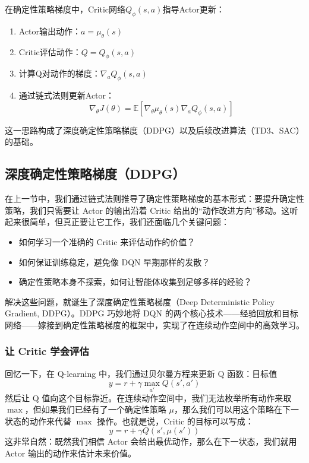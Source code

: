 \documentclass[lang=cn,zihao=-4,a4paper,fontset=windows]{beautybook}
\begin{document}
在确定性策略梯度中，Critic网络$Q_\phi(s,a)$指导Actor更新：
\begin{enumerate}
    \item Actor输出动作：$a = \mu_\theta(s)$
    \item Critic评估动作：$Q = Q_\phi(s, a)$
    \item 计算Q对动作的梯度：$\nabla_a Q_\phi(s, a)$
    \item 通过链式法则更新Actor：
    \[
    \nabla_\theta J(\theta) = \mathbb{E}[\nabla_\theta \mu_\theta(s) \nabla_a Q_\phi(s, a)]
    \]
\end{enumerate}

这一思路构成了深度确定性策略梯度（DDPG）以及后续改进算法（TD3、SAC）的基础。

\subsection{深度确定性策略梯度（DDPG）}

在上一节中，我们通过链式法则推导了确定性策略梯度的基本形式：要提升确定性策略，我们只需要让 Actor 的输出沿着 Critic 给出的“动作改进方向”移动。这听起来很简单，但真正要让它工作，我们还面临几个关键问题：
\begin{itemize}
    \item 如何学习一个准确的 Critic 来评估动作的价值？
    \item 如何保证训练稳定，避免像 DQN 早期那样的发散？
    \item 确定性策略本身不探索，如何让智能体收集到足够多样的经验？
\end{itemize}
解决这些问题，就诞生了深度确定性策略梯度（Deep Deterministic Policy Gradient, DDPG）。DDPG 巧妙地将 DQN 的两个核心技术——经验回放和目标网络——嫁接到确定性策略梯度的框架中，实现了在连续动作空间中的高效学习。

\subsubsection{让 Critic 学会评估}

回忆一下，在 Q-learning 中，我们通过贝尔曼方程来更新 Q 函数：目标值 \[y = r + \gamma \max_{a'} Q(s', a')\]然后让 Q 值向这个目标靠近。在连续动作空间中，我们无法枚举所有动作来取 \(\max\)，但如果我们已经有了一个确定性策略 \(\mu\)，那么我们可以用这个策略在下一状态的动作来代替 \(\max\) 操作。也就是说，Critic 的目标可以写成：
\[
y = r + \gamma Q(s', \mu(s'))
\]
这非常自然：既然我们相信 Actor 会给出最优动作，那么在下一状态，我们就用 Actor 输出的动作来估计未来价值。
\end{document}
